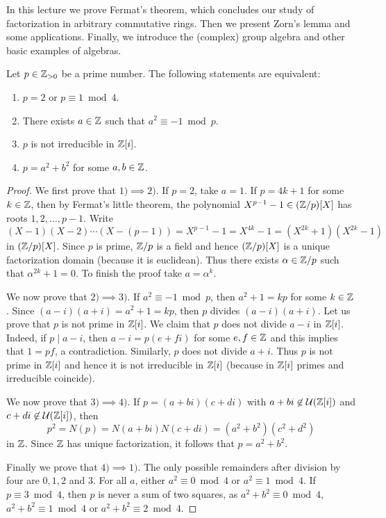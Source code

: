\lecture{}

In this lecture we prove Fermat's theorem, which concludes our study of
factorization in arbitrary commutative rings. Then we present Zorn's lemma
and some applications. Finally, we introduce the (complex) group algebra and
other basic examples of algebras. 

\begin{theorem}[Fermat]
	Let $p\in\mathbb{Z}_{>0}$ be a prime number. The following statements are equivalent:
	\begin{enumerate}
	    \item $p=2$ or $p\equiv1\bmod 4$.
	    \item There exists $a\in\mathbb{Z}$ such that $a^2\equiv-1\bmod p$.
	    \item $p$ is not irreducible in $\mathbb{Z}[i]$.
	    \item $p=a^2+b^2$ for some $a,b\in\mathbb{Z}$.
	\end{enumerate}
\end{theorem}

\begin{proof}
    We first prove that $1)\implies 2)$. If $p=2$, take $a=1$. If $p=4k+1$ for some $k\in\mathbb{Z}$, then
    by Fermat's little theorem, the polynomial 
    $X^{p-1}-1\in(\mathbb{Z}/p)[X]$ has roots $1,2,\dots,p-1$. Write
    \[
    (X-1)(X-2)\cdots (X-(p-1))=X^{p-1}-1=X^{4k}-1=(X^{2k}+1)(X^{2k}-1)
    \]
    in $(\mathbb{Z}/p)[X]$. Since $p$ is prime, $\mathbb{Z}/p$ is a field and hence 
    $(\mathbb{Z}/p)[X]$ is a unique factorization domain (because it is euclidean). Thus 
    there exists $\alpha\in\mathbb{Z}/p$ such that $\alpha^{2k}+1=0$. To finish the proof
    take $a=\alpha^k$. 
    
    We now prove that $2)\implies 3)$. If $a^2\equiv-1\bmod p$, then $a^2+1=kp$ 
    for some $k\in\mathbb{Z}$. Since $(a-i)(a+i)=a^2+1=kp$, then $p$ divides $(a-i)(a+i)$. Let us prove that $p$ is not prime in $\mathbb{Z}[i]$. 
    We claim that $p$ does not divide $a-i$ in $\mathbb{Z}[i]$. Indeed, if $p\mid a-i$, then
    $a-i=p(e+fi)$ for some $e,f\in\mathbb{Z}$ and this implies that $1=pf$, a contradiction. Similarly,
    $p$ does not divide $a+i$. Thus $p$ is not prime in $\mathbb{Z}[i]$ 
    and hence it is not irreducible in $\mathbb{Z}[i]$ (because in $\mathbb{Z}[i]$ primes and irreducible coincide). 
    
    We now prove that $3)\implies 4)$. If $p=(a+bi)(c+di)$ with $a+bi\not\in\mathcal{U}(\mathbb{Z}[i])$
    and  $c+di\not\in\mathcal{U}(\mathbb{Z}[i])$, then
    \[
    p^2=N(p)=N(a+bi)N(c+di)=(a^2+b^2)(c^2+d^2)
    \]
    in $\mathbb{Z}$. Since $\mathbb{Z}$ has unique factorization, it follows that $p=a^2+b^2$. 
    
    Finally we prove that $4)\implies 1)$. 
    The only possible remainders after division by four are $0,1,2$ and $3$.  
    For all $a$, either $a^2\equiv 0\bmod 4$ or $a^2\equiv 1\bmod 4$. 
    If $p\equiv3\bmod 4$, then $p$ is never a sum of two squares, as 
    $a^2+b^2\equiv 0\bmod 4$, $a^2+b^2\equiv 1\bmod 4$ or $a^2+b^2\equiv 2\bmod 4$. 
\end{proof}

